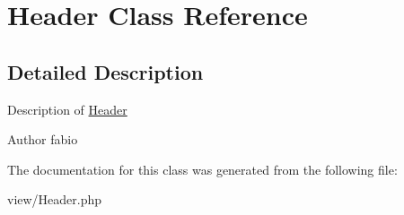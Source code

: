 \hypertarget{classHeader}{\section{Header Class Reference}
\label{classHeader}
}


\subsection{Detailed Description}
Description of \hyperlink{classHeader}{Header}

\begin{DoxyAuthor}{Author}
fabio 
\end{DoxyAuthor}


The documentation for this class was generated from the following file\+:\begin{DoxyCompactItemize}
\item 
view/Header.\+php\end{DoxyCompactItemize}
